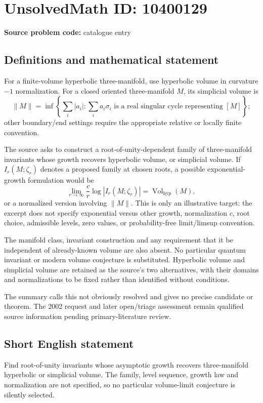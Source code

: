 \documentclass[11pt]{article}
\begin{document}
\section*{UnsolvedMath ID: 10400129}
\textbf{Source problem code:} catalogue entry
\subsection{Definitions and mathematical statement}
For a finite-volume hyperbolic three-manifold, use hyperbolic volume in curvature \(-1\) normalization. For a closed oriented three-manifold \(M\), its simplicial volume is
\[
 \|M\|=\inf\left\{\sum_i|a_i|:\sum_i a_i\sigma_i
 \text{ is a real singular cycle representing }[M]\right\};
\]
other boundary/end settings require the appropriate relative or locally finite convention.

The source asks to construct a root-of-unity-dependent family of three-manifold invariants whose growth recovers hyperbolic volume, or simplicial volume. If \(I_r(M;\zeta_r)\) denotes a proposed family at chosen roots, a possible exponential-growth formulation would be
\[
 \lim_{r\to\infty}\frac{c}{r}\log|I_r(M;\zeta_r)|
 =\operatorname{Vol}_{\mathrm{hyp}}(M),
\]
or a normalized version involving \(\|M\|\). This is only an illustrative target: the excerpt does not specify exponential versus other growth, normalization \(c\), root choice, admissible levels, zero values, or probability-free limit/limsup convention.

The manifold class, invariant construction and any requirement that it be independent of already-known volume are also absent. No particular quantum invariant or modern volume conjecture is substituted. Hyperbolic volume and simplicial volume are retained as the source's two alternatives, with their domains and normalizations to be fixed rather than identified without conditions.

The summary calls this not obviously resolved and gives no precise candidate or theorem. The 2002 request and later open/triage assessment remain qualified source information pending primary-literature review.
\subsection{Short English statement}
Find root-of-unity invariants whose asymptotic growth recovers three-manifold hyperbolic or simplicial volume. The family, level sequence, growth law and normalization are not specified, so no particular volume-limit conjecture is silently selected.
\end{document}
